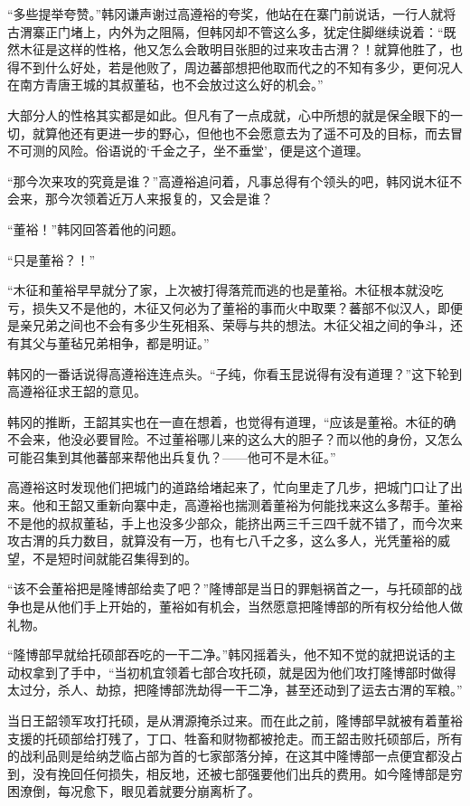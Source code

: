 “多些提举夸赞。”韩冈谦声谢过高遵裕的夸奖，他站在在寨门前说话，一行人就将古渭寨正门堵上，内外为之阻隔，但韩冈却不管这么多，犹定住脚继续说着：“既然木征是这样的性格，他又怎么会敢明目张胆的过来攻击古渭？！就算他胜了，也得不到什么好处，若是他败了，周边蕃部想把他取而代之的不知有多少，更何况人在南方青唐王城的其叔董毡，也不会放过这么好的机会。”

大部分人的性格其实都是如此。但凡有了一点成就，心中所想的就是保全眼下的一切，就算他还有更进一步的野心，但他也不会愿意去为了遥不可及的目标，而去冒不可测的风险。俗语说的‘千金之子，坐不垂堂’，便是这个道理。

“那今次来攻的究竟是谁？”高遵裕追问着，凡事总得有个领头的吧，韩冈说木征不会来，那今次领着近万人来报复的，又会是谁？

“董裕！”韩冈回答着他的问题。

“只是董裕？！”

“木征和董裕早早就分了家，上次被打得落荒而逃的也是董裕。木征根本就没吃亏，损失又不是他的，木征又何必为了董裕的事而火中取栗？蕃部不似汉人，即便是亲兄弟之间也不会有多少生死相系、荣辱与共的想法。木征父祖之间的争斗，还有其父与董毡兄弟相争，都是明证。”

韩冈的一番话说得高遵裕连连点头。“子纯，你看玉昆说得有没有道理？”这下轮到高遵裕征求王韶的意见。

韩冈的推断，王韶其实也在一直在想着，也觉得有道理，“应该是董裕。木征的确不会来，他没必要冒险。不过董裕哪儿来的这么大的胆子？而以他的身份，又怎么可能召集到其他蕃部来帮他出兵复仇？——他可不是木征。”

高遵裕这时发现他们把城门的道路给堵起来了，忙向里走了几步，把城门口让了出来。他和王韶又重新向寨中走，高遵裕也揣测着董裕为何能找来这么多帮手。董裕不是他的叔叔董毡，手上也没多少部众，能挤出两三千三四千就不错了，而今次来攻古渭的兵力数目，就算没有一万，也有七八千之多，这么多人，光凭董裕的威望，不是短时间就能召集得到的。

“该不会董裕把是隆博部给卖了吧？”隆博部是当日的罪魁祸首之一，与托硕部的战争也是从他们手上开始的，董裕如有机会，当然愿意把隆博部的所有权分给他人做礼物。

“隆博部早就给托硕部吞吃的一干二净。”韩冈摇着头，他不知不觉的就把说话的主动权拿到了手中，“当初机宜领着七部合攻托硕，就是因为他们攻打隆博部时做得太过分，杀人、劫掠，把隆博部洗劫得一干二净，甚至还动到了运去古渭的军粮。”

当日王韶领军攻打托硕，是从渭源掩杀过来。而在此之前，隆博部早就被有着董裕支援的托硕部给打残了，丁口、牲畜和财物都被抢走。而王韶击败托硕部后，所有的战利品则是给纳芝临占部为首的七家部落分掉，在这其中隆博部一点便宜都没占到，没有挽回任何损失，相反地，还被七部强要他们出兵的费用。如今隆博部是穷困潦倒，每况愈下，眼见着就要分崩离析了。


